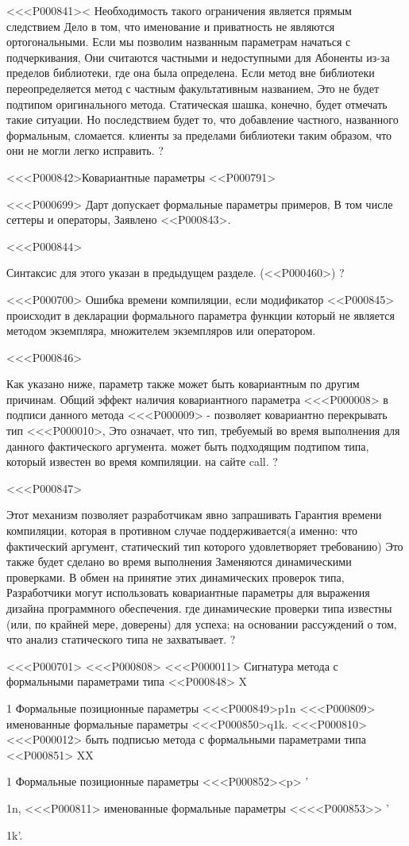 {<<<P000841><%
Необходимость такого ограничения является прямым следствием
Дело в том, что именование и приватность не являются ортогональными.
Если мы позволим названным параметрам начаться с подчеркивания,
Они считаются частными и недоступными для
Абоненты из-за пределов библиотеки, где она была определена.
Если метод вне библиотеки переопределяется
метод с частным факультативным названием,
Это не будет подтипом оригинального метода.
Статическая шашка, конечно, будет отмечать такие ситуации.
Но последствием будет то, что добавление частного, названного формальным, сломается.
клиенты за пределами библиотеки таким образом, что они не могли легко исправить.
?


<<<P000842>{Ковариантные параметры}
<<P000791>

<<<P000699>%
Дарт допускает формальные параметры примеров,
В том числе сеттеры и операторы,
Заявлено <<P000843>.

<<<P000844>{%
Синтаксис для этого указан в предыдущем разделе.
(<<P000460>)%
?

<<<P000700>%
Ошибка времени компиляции, если модификатор <<P000845> происходит
в декларации формального параметра функции
который не является методом экземпляра, множителем экземпляров или оператором.

<<<P000846>{%
Как указано ниже, параметр также может быть ковариантным по другим причинам.
Общий эффект наличия ковариантного параметра <<<P000008>
в подписи данного метода <<<P000009>
- позволяет ковариантно перекрывать тип <<<P000010>,
Это означает, что тип, требуемый во время выполнения для данного фактического аргумента.
может быть подходящим подтипом типа, который известен во время компиляции.
на сайте call.%
?

<<<P000847>{%
Этот механизм позволяет разработчикам явно запрашивать
Гарантия времени компиляции, которая в противном случае поддерживается(а именно: что фактический аргумент, статический тип которого удовлетворяет требованию)
Это также будет сделано во время выполнения
Заменяются динамическими проверками.
В обмен на принятие этих динамических проверок типа,
Разработчики могут использовать ковариантные параметры для выражения дизайна программного обеспечения.
где динамические проверки типа известны (или, по крайней мере, доверены) для успеха;
на основании рассуждений о том, что анализ статического типа не захватывает.%
?

<<<P000701>%
<<<P000808>%
<<<P000011> Сигнатура метода с формальными параметрами типа
<<P000848> X}{1}{}
Формальные позиционные параметры <<<P000849>{p}{1}{n}
<<<P000809>%
именованные формальные параметры <<<P000850>{q}{1}{k}.
<<<P000810>%
<<<P000012> быть подписью метода с формальными параметрами типа
<<P000851> XX \!}{1}{}
Формальные позиционные параметры <<<P000852><p> '\!}{1}{n},
<<<P000811>%
именованные формальные параметры <<<<P000853>> '\!}{1}{k'}.
